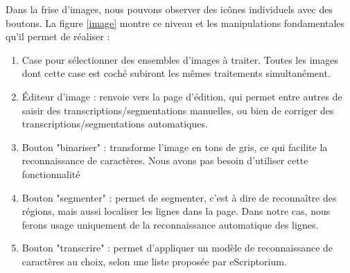 \documentclass[a4paper,12pt,twoside]{book}
\begin{document}
Dans la frise d'images, nous pouvons observer des icônes individuels avec des boutons. La figure \ref{image} montre ce niveau et les manipulations fondamentales qu'il permet de réaliser :
\begin{enumerate}
\item Case pour sélectionner des ensembles d'images à traiter. Toutes les images dont cette case est coché subiront les mêmes traitements simultanément.
\item Éditeur d'image : renvoie vers la page d'édition, qui permet entre autres de saisir des transcriptions/segmentations manuelles, ou bien de corriger des transcriptions/segmentations automatiques. 
\item Bouton "binariser" : transforme l'image en tons de gris, ce qui facilite la reconnaissance de caractères. Nous avons pas besoin d'utiliser cette fonctionnalité
\item Bouton "segmenter" : permet de segmenter, c'est à dire de reconnaître des régions, mais aussi localiser les lignes dans la page. Dans notre cas, nous ferons usage uniquement de la reconnaissance automatique des lignes.
\item Bouton "transcrire" : permet d'appliquer un modèle de reconnaissance de caractères au choix, selon une liste proposée par eScriptorium.
\end{enumerate}
\end{document}
